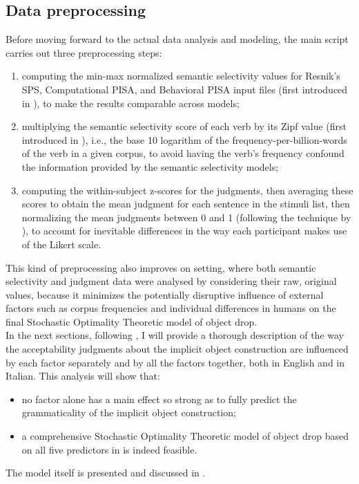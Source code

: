 \subsection{Data preprocessing} 

Before moving forward to the actual data analysis and modeling, the main script carries out three preprocessing steps:
\begin{enumerate}
    \item computing the min-max normalized semantic selectivity values for Resnik's SPS, Computational PISA, and Behavioral PISA input files (first introduced in ), to make the results comparable across models;
    \item multiplying the semantic selectivity score of each verb by its Zipf value (first introduced in ), i.e., the base 10 logarithm of the frequency-per-billion-words of the verb in a given corpus, to avoid having the verb's frequency confound the information provided by the semantic selectivity models;
    \item computing the within-subject z-scores for the judgments, then averaging these scores to obtain the mean judgment for each sentence in the stimuli list, then normalizing the mean judgments between 0 and 1 (following the technique by \textcite{KimEtAl2018, KimEtAl2019, KimEtAl2019a}), to account for inevitable differences in the way each participant makes use of the Likert scale.
\end{enumerate}

This kind of preprocessing also improves on  setting, where both semantic selectivity and judgment data were analysed by considering their raw, original values, because it minimizes the potentially disruptive influence of external factors such as corpus frequencies and individual differences in humans on the final Stochastic Optimality Theoretic model of object drop.\\
In the next sections, following \textcite{Medina2007}, I will provide a thorough description of the way the acceptability judgments about the implicit object construction are influenced by each factor separately and by all the factors together, both in English and in Italian. This analysis will show that:
\begin{itemize}
    \item no factor alone has a main effect so strong as to fully predict the grammaticality of the implicit object construction;
    \item a comprehensive Stochastic Optimality Theoretic model of object drop based on all five predictors in  is indeed feasible.
\end{itemize}
The model itself is presented and discussed in .


